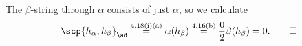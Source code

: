 The $\beta$-string through $\alpha$ consists of just $\alpha$, so we calculate
\[ \scp{h_\alpha, h_\beta}_{\ad} \stackrel{\text{4.18(i)(a)}}{=} \alpha(h_\beta) \stackrel{\text{4.16(b)}}{=} \frac{0}{2}\beta(h_\beta) = 0.\qedhere \]
